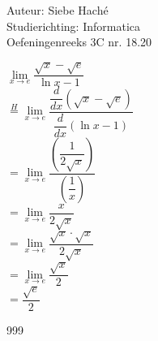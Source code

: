 \documentclass[a4paper]{article}
\begin{document}
\noindent \large Auteur: Siebe Haché \\
\noindent \large Studierichting: Informatica\\
\noindent \large Oefeningenreeks 3C nr. 18.20\\

\medskip
\normalsize

$ \lim\limits_{x \to e} \dfrac{\sqrt{x} - \sqrt{e}}{\ln x - 1} $ \\

$ \overset{H}{=} \lim\limits_{x \to e} \dfrac{\dfrac{d}{dx} \left( \sqrt{x} - \sqrt{e} \right)}{\dfrac{d}{dx} \left( \ln x - 1 \right)} $ \\

$ = \lim\limits_{x \to e} \dfrac{\left( \dfrac{1}{2\sqrt{x}} \right)}{\left( \dfrac{1}{x} \right)} $ \\

$ = \lim\limits_{x \to e} \dfrac{x}{2\sqrt{x}} $\\

$ = \lim\limits_{x \to e} \dfrac{\sqrt{x} \cdot \sqrt{x}}{2\sqrt{x}} $ \\

$ = \lim\limits_{x \to e} \dfrac{\sqrt{x}}{2} $ \\

$ = \dfrac{\sqrt{e}}{2} $ \\

\begin{thebibliography}{999}
\end{thebibliography}
\end{document}

